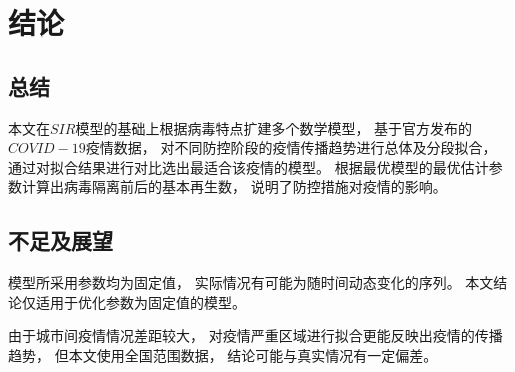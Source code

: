 \section{结论}
\subsection{总结}
\par 本文在$SIR$模型的基础上根据病毒特点扩建多个数学模型，
基于官方发布的$COVID-19$疫情数据，
对不同防控阶段的疫情传播趋势进行总体及分段拟合，
通过对拟合结果进行对比选出最适合该疫情的模型。
根据最优模型的最优估计参数计算出病毒隔离前后的基本再生数，
说明了防控措施对疫情的影响。
\subsection{不足及展望}
\par 模型所采用参数均为固定值，
实际情况有可能为随时间动态变化的序列。
本文结论仅适用于优化参数为固定值的模型。
\par 由于城市间疫情情况差距较大，
对疫情严重区域进行拟合更能反映出疫情的传播趋势，
但本文使用全国范围数据，
结论可能与真实情况有一定偏差。